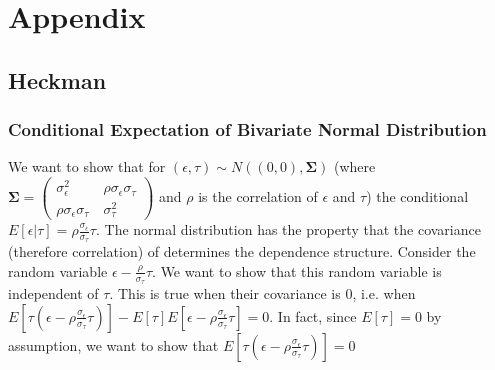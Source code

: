 \documentclass[12pt,twoside]{reedthesis}
\theoremstyle{definition}
\begin{document}

%  
 
\nocite{*}%
%  
\appendix
\chapter{Appendix}

\section{Heckman}
\subsection{Conditional Expectation of Bivariate Normal Distribution}

We want to show that for $(\epsilon, \tau) \sim N((0,0), \boldsymbol{\Sigma})$ (where $\boldsymbol{\Sigma} = \begin{pmatrix}
\sigma_\epsilon^2 &\ \rho \sigma_\epsilon \sigma_\tau \\
\rho \sigma_\epsilon \sigma_\tau &\ \sigma_\tau^2
\end{pmatrix}$ and $\rho$ is the correlation of $\epsilon$ and $\tau$) the conditional $E[\epsilon | \tau] = \rho \frac{\sigma_\epsilon}{\sigma_\tau} \tau$. The normal distribution has the property that the covariance (therefore correlation) of determines the dependence structure. Consider the random variable $\epsilon - \frac{\rho}{\sigma_\tau} \tau$. We want to show that this random variable is independent of $\tau$. This is true when their covariance is $0$, i.e. when $E[\tau (\epsilon -\rho \frac{\sigma_\epsilon}{\sigma_\tau}\tau)] - E[\tau] E[\epsilon - \rho \frac{\sigma_\epsilon}{\sigma_\tau}  \tau] = 0$. In fact, since $E[\tau]=0$ by assumption, we want to show that $E[\tau (\epsilon -\rho \frac{\sigma_\epsilon}{\sigma_\tau} \tau)] = 0$
\end{document}
